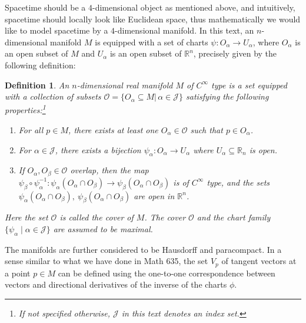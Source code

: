 \documentclass[11pt, onesided]{book}
\theoremstyle{break}
\theoremstyle{break}
\newtheorem{defn}{Definition}[thm]
\newcommand{\R}{\mathbb{R}}
\begin{document}
Spacetime should be a $4$-dimensional object as mentioned above, and intuitively, spacetime should locally look like Euclidean space, thus mathematically we would like to model spacetime by a $4$-dimensional manifold. In this text, an $n$-dimensional manifold $M$ is equipped with a set of charts $\psi:O_\alpha \to U_\alpha$, where $O_\alpha$ is an open subset of $M$ and $U_\alpha$ is an open subset of $\R^n$, precisely given by the following definition:
\begin{defn}
An $n$-dimensional real manifold $M$ of $C^\infty$ type is a set equipped with a collection of subsets $\mathcal{O} = \{O_\alpha \subseteq M |\, \alpha\in \mathcal{J}\}$ satisfying the following properties:\footnote{If not specified otherwise, $\mathcal{J}$ in this text denotes an index set.}
\begin{enumerate}[topsep=3pt,itemsep=-1ex,partopsep=1ex,parsep=1ex]
\item For all $p \in M$, there exists at least one $O_\alpha \in \mathcal{O}$ such that $p \in O_\alpha$. 
\item For $\alpha \in \mathcal{J}$, there exists a bijection $\psi_\alpha:O_\alpha \to U_\alpha$ where $U_\alpha\subseteq \R_n$ is open. 
\item If $O_\alpha, O_\beta\in \mathcal{O}$ overlap, then the map $\psi_\beta \circ \psi_\alpha^{-1}:\psi_{\alpha}(O_\alpha \cap O_\beta) \to \psi_{\beta}(O_\alpha \cap O_\beta)$ is of $C^\infty$ type, and the sets $\psi_{\alpha}(O_\alpha \cap O_\beta),\ \psi_{\beta}(O_\alpha \cap O_\beta)$ are open in $\R^n$. 
\end{enumerate}
Here the set $\mathcal{O}$ is called the cover of $M$. The cover $\mathcal{O}$ and the chart family $\{\psi_\alpha \mid \alpha \in \mathcal{J}\}$ are assumed to be maximal.
\end{defn}
 
The manifolds are further considered to be Hausdorff and paracompact. In a sense similar to what we have done in Math 635, the set $V_p$ of tangent vectors at a point $p \in M$ can be defined using the one-to-one correspondence between vectors and directional derivatives of the inverse of the charts $\phi$.\\
\end{document}
